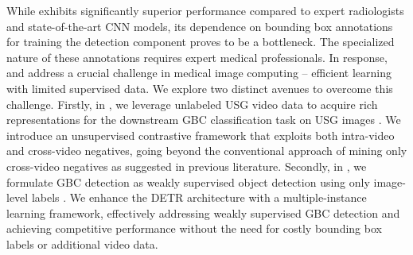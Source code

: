 \par While \gbcnet exhibits significantly superior performance compared to expert radiologists and state-of-the-art CNN models, its dependence on bounding box annotations for training the detection component proves to be a bottleneck. The specialized nature of these annotations requires expert medical professionals. In response,  and  address a crucial challenge in medical image computing -- efficient learning with limited supervised data. We explore two distinct avenues to overcome this challenge. Firstly, in , we leverage unlabeled USG video data to acquire rich representations for the downstream GBC classification task on USG images \cite{basu2022unsupervised}. We introduce an unsupervised contrastive framework that exploits both intra-video and cross-video negatives, going beyond the conventional approach of mining only cross-video negatives as suggested in previous literature. Secondly, in , we formulate GBC detection as weakly supervised object detection using only image-level labels \cite{basu2023gall}. We enhance the DETR architecture with a multiple-instance learning framework, effectively addressing weakly supervised GBC detection and achieving competitive performance without the need for costly bounding box labels or additional video data.

